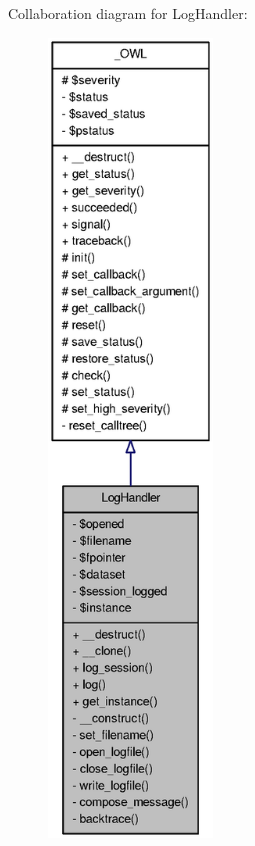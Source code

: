 Collaboration diagram for LogHandler:
\nopagebreak
\begin{figure}[H]
\begin{center}
\leavevmode
\includegraphics[height=600pt]{classLogHandler__coll__graph}
\end{center}
\end{figure}
